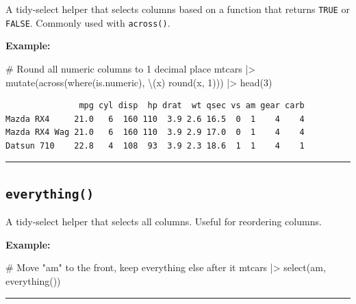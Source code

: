 \documentclass[
  letterpaper,
  DIV=11,
  numbers=noendperiod]{scrreprt}
\newenvironment{Shaded}{\begin{snugshade}}{\end{snugshade}}
\newcommand{\CommentTok}[1]{\textcolor[rgb]{0.37,0.37,0.37}{#1}}
\newcommand{\DecValTok}[1]{\textcolor[rgb]{0.68,0.00,0.00}{#1}}
\newcommand{\FunctionTok}[1]{\textcolor[rgb]{0.28,0.35,0.67}{#1}}
\newcommand{\NormalTok}[1]{\textcolor[rgb]{0.00,0.23,0.31}{#1}}
\newcommand{\SpecialCharTok}[1]{\textcolor[rgb]{0.37,0.37,0.37}{#1}}
\begin{document}
A tidy-select helper that selects columns based on a function that
returns \texttt{TRUE} or \texttt{FALSE}. Commonly used with
\texttt{across()}.

\textbf{Example:}

\begin{Shaded}
\begin{Highlighting}[]
\CommentTok{\# Round all numeric columns to 1 decimal place}
\NormalTok{mtcars }\SpecialCharTok{|\textgreater{}}
  \FunctionTok{mutate}\NormalTok{(}\FunctionTok{across}\NormalTok{(}\FunctionTok{where}\NormalTok{(is.numeric), \textbackslash{}(x) }\FunctionTok{round}\NormalTok{(x, }\DecValTok{1}\NormalTok{))) }\SpecialCharTok{|\textgreater{}}
  \FunctionTok{head}\NormalTok{(}\DecValTok{3}\NormalTok{)}
\end{Highlighting}
\end{Shaded}

\begin{verbatim}
               mpg cyl disp  hp drat  wt qsec vs am gear carb
Mazda RX4     21.0   6  160 110  3.9 2.6 16.5  0  1    4    4
Mazda RX4 Wag 21.0   6  160 110  3.9 2.9 17.0  0  1    4    4
Datsun 710    22.8   4  108  93  3.9 2.3 18.6  1  1    4    1
\end{verbatim}

\begin{center}\rule{0.5\linewidth}{0.5pt}\end{center}

\subsection{\texorpdfstring{\texttt{everything()}}{everything()}}\label{everything}

A tidy-select helper that selects all columns. Useful for reordering
columns.

\textbf{Example:}

\begin{Shaded}
\begin{Highlighting}[]
\CommentTok{\# Move "am" to the front, keep everything else after it}
\NormalTok{mtcars }\SpecialCharTok{|\textgreater{}} \FunctionTok{select}\NormalTok{(am, }\FunctionTok{everything}\NormalTok{())}
\end{Highlighting}
\end{Shaded}

\begin{center}\rule{0.5\linewidth}{0.5pt}\end{center}
\end{document}
